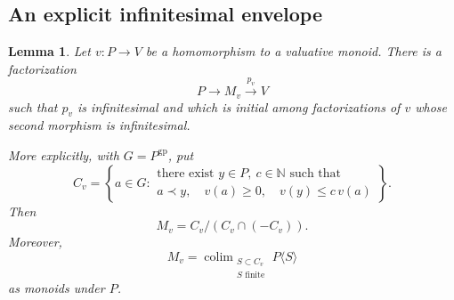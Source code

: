 \documentclass[11pt]{article}
\newtheorem{lemma}[theorem]{Lemma}
\theoremstyle{definition}
\theoremstyle{remark}
\DeclareMathOperator{\colim}{colim}
\newcommand{\gp}{\mathrm{gp}}
\newcommand{\NN}{\mathbb N}
\begin{document}
\subsection{An explicit infinitesimal envelope}

\begin{lemma}\label{lem:envelope}
Let \(v:P\to V\) be a homomorphism to a valuative monoid. There is a
factorization
\[
P\longrightarrow M_v\xrightarrow{p_v}V
\]
such that \(p_v\) is infinitesimal and which is initial among
factorizations of \(v\) whose second morphism is infinitesimal.

More explicitly, with \(G=P^{\gp}\), put
\begin{equation}\label{eq:envelope-cone}
C_v=
\left\{
a\in G:
\begin{array}{l}
\text{there exist }y\in P,\ c\in\NN\text{ such that}\\
a\prec y,\quad v(a)\ge0,\quad v(y)\le c\,v(a)
\end{array}
\right\}.
\end{equation}
Then
\[
M_v=C_v/(C_v\cap(-C_v)).
\]
Moreover,
\begin{equation}\label{eq:envelope-colimit}
M_v=\colim_{\substack{S\subset C_v\\S\text{ finite}}}
P\langle S\rangle
\end{equation}
as monoids under \(P\).
\end{lemma}
\end{document}
